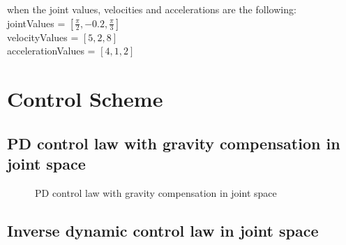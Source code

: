 \documentclass{article}
\begin{document}
when the joint values, velocities and accelerations are the following:
\\

jointValues = $[\frac{\pi}{2}, -0.2, \frac{\pi}{3}]$ \\

velocityValues = $[5, 2, 8]$ \\

accelerationValues = $[4, 1, 2]$




\section{Control Scheme}
\justify

\subsection{PD control law with gravity compensation in joint space}

\begin{figure}[H]
    \centering
    \caption{PD control law with gravity compensation in joint space}
    \label{fig:PD control law with gravity compensation in joint space}
\end{figure}



\subsection{Inverse dynamic control law in joint space}
\end{document}
